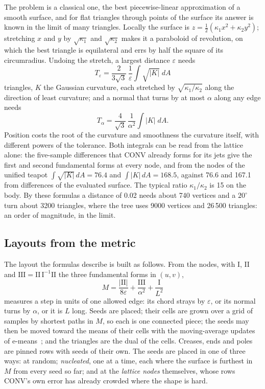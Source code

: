 \documentclass[journal]{IEEEtran}
\begin{document}
The problem is a classical one, the best piecewise-linear approximation
of a smooth surface, and for flat triangles through points of the
surface its answer is known in the limit of many triangles. Locally the
surface is $z=\tfrac12(\kappa_1x^2+\kappa_2y^2)$; stretching $x$ and $y$
by $\sqrt{\kappa_1}$ and $\sqrt{\kappa_2}$ makes it a paraboloid of
revolution, on which the best triangle is equilateral and errs by half
the square of its circumradius. Undoing the stretch, a largest distance
$\varepsilon$ needs
\begin{equation}
 T_\varepsilon=\frac{2}{3\sqrt3}\,\frac{1}{\varepsilon}\int\!\sqrt{|K|}\;dA
\end{equation}
triangles, $K$ the Gaussian curvature, each stretched by
$\sqrt{\kappa_1/\kappa_2}$ along the direction of least curvature; and a
normal that turns by at most $\alpha$ along any edge needs
\begin{equation}
 T_\alpha=\frac{4}{\sqrt3}\,\frac{1}{\alpha^2}\int\!|K|\;dA .
\end{equation}
Position costs the root of the curvature and smoothness the curvature
itself, with different powers of the tolerance. Both integrals can be
read from the lattice alone: the five-sample differences that CONV
already forms for its jets give the first and second fundamental forms
at every node, and from the nodes of the unified teapot
$\int\!\sqrt{|K|}\,dA=76.4$ and $\int\!|K|\,dA=168.5$, against 76.6 and
167.1 from differences of the evaluated surface. The typical ratio
$\kappa_1/\kappa_2$ is 15 on the body. By these formulas a distance of
0.02 needs about 740 vertices and a $20^\circ$ turn about 3200 triangles,
where the tree uses 9000 vertices and 26\,500 triangles: an order of
magnitude, in the limit.

\subsection{Layouts from the metric}
\label{sec:layouts}

The layout the formulas describe is built as follows. From the nodes, with $\mathrm{I}$, $\mathrm{II}$ and
$\mathrm{III}=\mathrm{II}\,\mathrm{I}^{-1}\mathrm{II}$ the three
fundamental forms in $(u,v)$,
\begin{equation}
 M=\frac{|\mathrm{II}|}{8\varepsilon}+\frac{\mathrm{III}}{\alpha^2}+\frac{\mathrm{I}}{L^2}
\end{equation}
measures a step in units of one allowed edge: its chord strays by
$\varepsilon$, or its normal turns by $\alpha$, or it is $L$ long. Seeds
are placed; their cells are grown over a grid of samples by shortest
paths in $M$, so each is one connected piece; the seeds may then be
moved toward the means of their cells with the moving-average updates
of e-means~\cite{emeans}; and the triangles are the dual of the cells.
Creases, ends and poles are pinned rows with seeds of their own. The seeds are placed in one of three ways: at random; \emph{nucleated}, one at
a time, each where the surface is furthest in $M$ from every seed so
far; and at the \emph{lattice nodes} themselves, whose rows CONV's own
error has already crowded where the shape is hard.
\end{document}
